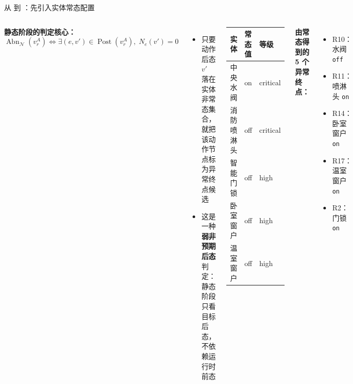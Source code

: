 \documentclass[aspectratio=169,10pt]{beamer}
\newcommand{\HL}[1]{\textcolor{emphasis}{#1}}
\newcommand{\RAG}{\text{RAG}}
\newcommand{\USTG}{\text{USTG}}
\begin{document}
\begin{frame}{从 \RAG 到 \USTG：先引入实体常态配置}
\begin{columns}[T]
  \textbf{静态阶段的判定核心：}
  \[
    \operatorname{Abn}_{\mathcal N}(v_r^A)
    \Longleftrightarrow
    \exists (e,v')\in \operatorname{Post}(v_r^A),\; N_e(v')=0
  \]
  \begin{itemize}
    \item 只要动作后态 $v'$ 落在实体非常态集合，就把该动作节点标为\HL{异常终点候选}
    \item 这是一种\textbf{弱非预期后态}判定：静态阶段只看目标后态，不依赖运行时前态
  \end{itemize}

  \begin{center}
  \small
  \begin{tabular}{lll}
  \toprule
  实体 & 常态值 & 等级 \\
  \midrule
  中央水阀 & on & critical \\
  消防喷淋头 & off & critical \\
  智能门锁 & off & high \\
  卧室窗户 & off & high \\
  温室窗户 & off & high \\
  \bottomrule
  \end{tabular}
  \end{center}

  \vspace{4pt}
  \textbf{由常态得到的 5 个异常终点：}
  \begin{itemize}
    \item R10：水阀 \texttt{off}
    \item R11：喷淋头 \texttt{on}
    \item R14：卧室窗户 \texttt{on}
    \item R17：温室窗户 \texttt{on}
    \item R2：门锁 \texttt{on}
  \end{itemize}
\end{columns}
\end{frame}
\end{document}
